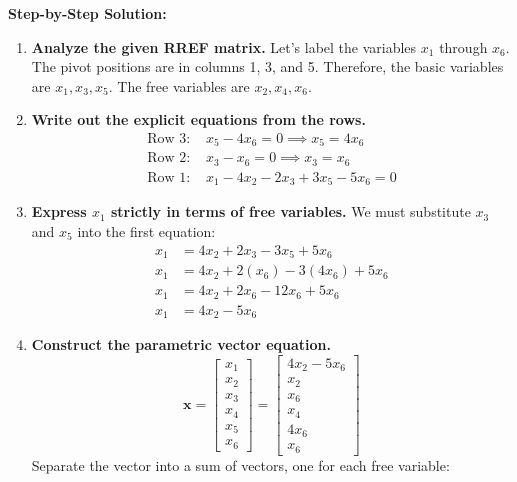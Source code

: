 \documentclass[11pt]{article}
\begin{document}
\textbf{Step-by-Step Solution:}
\begin{enumerate}
    \item \textbf{Analyze the given RREF matrix.} Let's label the variables $x_1$ through $x_6$.
    The pivot positions are in columns 1, 3, and 5. 
    Therefore, the basic variables are $x_1, x_3, x_5$.
    The free variables are $x_2, x_4, x_6$.
    \item \textbf{Write out the explicit equations from the rows.}
    \begin{align*}
        \text{Row 3: } & x_5 - 4x_6 = 0 \implies x_5 = 4x_6 \\
        \text{Row 2: } & x_3 - x_6 = 0 \implies x_3 = x_6 \\
        \text{Row 1: } & x_1 - 4x_2 - 2x_3 + 3x_5 - 5x_6 = 0
    \end{align*}
    \item \textbf{Express $x_1$ strictly in terms of free variables.} We must substitute $x_3$ and $x_5$ into the first equation:
    \begin{align*}
        x_1 &= 4x_2 + 2x_3 - 3x_5 + 5x_6 \\
        x_1 &= 4x_2 + 2(x_6) - 3(4x_6) + 5x_6 \\
        x_1 &= 4x_2 + 2x_6 - 12x_6 + 5x_6 \\
        x_1 &= 4x_2 - 5x_6
    \end{align*}
    \item \textbf{Construct the parametric vector equation.}
    \[
    \mathbf{x} = \begin{bmatrix} x_1 \\ x_2 \\ x_3 \\ x_4 \\ x_5 \\ x_6 \end{bmatrix} = \begin{bmatrix} 4x_2 - 5x_6 \\ x_2 \\ x_6 \\ x_4 \\ 4x_6 \\ x_6 \end{bmatrix}
    \]
    Separate the vector into a sum of vectors, one for each free variable:
    \[
\]
\end{enumerate}
\end{document}
